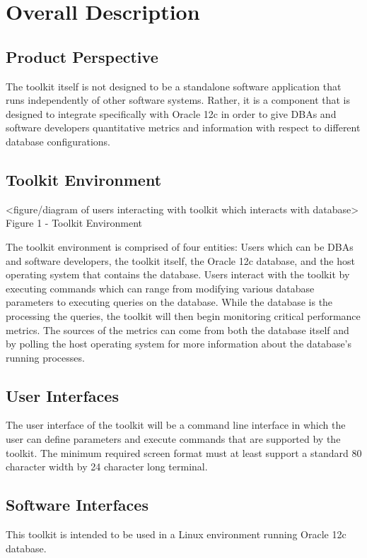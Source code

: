\documentclass[draftclsnofoot, onecolumn, 10pt]{IEEEtran}
\begin{document}
\section{Overall Description}

\subsection{Product Perspective}
The toolkit itself is not designed to be a standalone software application that runs independently of other software systems. Rather, it is a component that is designed to integrate specifically with Oracle 12c in order to give DBAs and software developers quantitative metrics and information with respect to different database configurations.

\subsection{Toolkit Environment}
<figure/diagram of users interacting with toolkit which interacts with database>
Figure 1 - Toolkit Environment

The toolkit environment is comprised of four entities: Users which can be DBAs and software developers, the toolkit itself, the Oracle 12c database, and the host operating system that contains the database. Users interact with the toolkit by executing commands which can range from modifying various database parameters to executing queries on the database. While the database is the processing the queries, the toolkit will then begin monitoring critical performance metrics. The sources of the metrics can come from both the database itself and by polling the host operating system for more information about the database’s running processes.

\subsection{User Interfaces}
The user interface of the toolkit will be a command line interface in which the user can define parameters and execute commands that are supported by the toolkit. The minimum required screen format must at least support a standard 80 character width by 24 character long terminal.

\subsection{Software Interfaces}
This toolkit is intended to be used in a Linux environment running Oracle 12c database.
\end{document}
